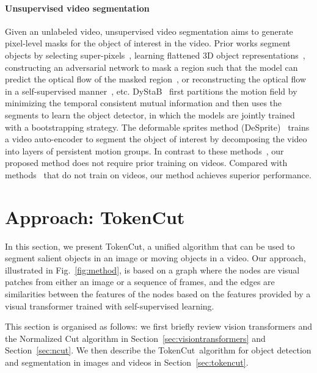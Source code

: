 \documentclass[twocolumn]{article}
\newcommand{\name} {TokenCut}
\begin{document}
\paragraph*{Unsupervised video segmentation}
Given an unlabeled video, unsupervised video segmentation aims to generate pixel-level masks for the object of interest in the video. Prior works segment objects by selecting super-pixels~\cite{koh2017primary}, learning flattened 3D object representations~\cite{lao2018extending}, constructing an adversarial network to mask a region such that the model can predict the optical flow of the masked region~\cite{yang2019unsupervised}, or reconstructing the optical flow in a self-supervised manner~\cite{yang2021self}, etc.
DyStaB~\cite{yang2021dystab} first partitions the motion field by minimizing the temporal consistent mutual information and then uses the segments to learn the object detector, in which the models are jointly trained with a bootstrapping strategy. The deformable sprites method (DeSprite)~\cite{ye2022deformable} trains a video auto-encoder to segment the object of interest by decomposing the video into layers of persistent motion groups. In contrast to these methods~\cite{yang2019unsupervised, yang2021self, yang2021dystab}, our proposed method does not require prior training on videos. Compared with methods~\cite{koh2017primary, lao2018extending} that do not train on videos, our method achieves superior performance.



\section{Approach: \name}
\label{sec:approach}

In this section, we present {\name}, a unified algorithm that can be used to segment salient objects in an image or moving objects in a video. Our approach, illustrated in Fig.~\ref{fig:method}, is based on a graph where the nodes are visual patches from either an image or a sequence of frames, and the edges are similarities between the features of the nodes based on the features provided by a visual transformer trained with  self-supervised learning.

This section is organised as follows: we first briefly review  vision transformers and the Normalized Cut algorithm
in Section~\ref{sec:visiontransformers} and Section~\ref{sec:ncut}. 
We then describe  the \name~algorithm for object detection and segmentation in images and videos in Section~\ref{sec:tokencut}.
\end{document}
